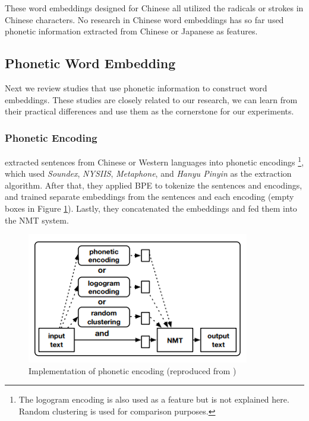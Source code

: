 These word embeddings designed for Chinese all utilized the radicals or strokes in Chinese characters. No research in Chinese word embeddings has so far used phonetic information extracted from Chinese or Japanese as features.

\subsection{Phonetic Word Embedding} \label{sec:rw_pwe}

Next we review studies that use phonetic information to construct word embeddings. These studies are closely related to our research, we can learn from their practical differences and use them as the cornerstone for our experiments.

\subsubsection{Phonetic Encoding}

\cite{khan2019diversity} extracted sentences from Chinese or Western languages into phonetic encodings \footnote{The logogram encoding is also used as a feature but is not explained here. Random clustering is used for comparison purposes.}, which used \textit{Soundex}, \textit{NYSIIS}, \textit{Metaphone}, and \textit{Hanyu Pinyin} as the extraction algorithm. After that, they applied BPE \cite{sennrich_neural_2016} to tokenize the sentences and encodings, and trained separate embeddings from the sentences and each encoding (empty boxes in Figure \ref{fig:phonetic1}). Lastly, they concatenated the embeddings and fed them into the NMT system. 

\begin{figure}[h]
	\centering
	\includegraphics[scale=0.9]{../images/phonetic_encoding.png}
	\caption{Implementation of phonetic encoding (reproduced from \cite{khan2019diversity})}
	\label{fig:phonetic1}
\end{figure}

